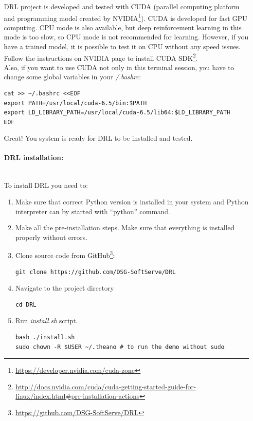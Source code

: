 \documentclass[a4paper,oneside,dvipsnames]{article}
\begin{document}
DRL project is developed and tested with CUDA (parallel computing platform and programming model created by NVIDIA\footnote{\url{https://developer.nvidia.com/cuda-zone}}). CUDA is developed for fast GPU computing. CPU mode is also available, but deep reinforcement learning in this mode is too slow, so CPU mode is not recommended for learning. However, if you have a trained model, it is possible to test it on CPU without any speed issues. \\
\indent
Follow the instructions on NVIDIA page to install CUDA SDK\footnote{\url{http://docs.nvidia.com/cuda/cuda-getting-started-guide-for-linux/index.html\#pre-installation-actions}}. \\
\indent
Also, if you want to use CUDA not only in this terminal session, you have to change some global variables in your \textit{\raisebox{0.5ex}{\texttildelow}/.bashrc}:
\begin{verbatim}
cat >> ~/.bashrc <<EOF
export PATH=/usr/local/cuda-6.5/bin:$PATH
export LD_LIBRARY_PATH=/usr/local/cuda-6.5/lib64:$LD_LIBRARY_PATH
EOF
\end{verbatim}

Great! You system is ready for DRL to be installed and tested.

\paragraph*{DRL installation:}\mbox{}\\

To install DRL you need to:
\begin{enumerate}
\item Make sure that correct Python version is installed in your system and Python interpreter can by started with ``python'' command.
\item Make all the pre-installation steps. Make sure that everything is installed properly without errors.
\item Clone source code from GitHub\footnote{\url{https://github.com/DSG-SoftServe/DRL}}:
\begin{verbatim}
git clone https://github.com/DSG-SoftServe/DRL
\end{verbatim}
\item Navigate to the project directory
\begin{verbatim}
cd DRL
\end{verbatim}
\item Run \textit{install.sh} script.
\begin{verbatim}
bash ./install.sh
sudo chown -R $USER ~/.theano # to run the demo without sudo
\end{verbatim}
\end{enumerate}
\end{document}
